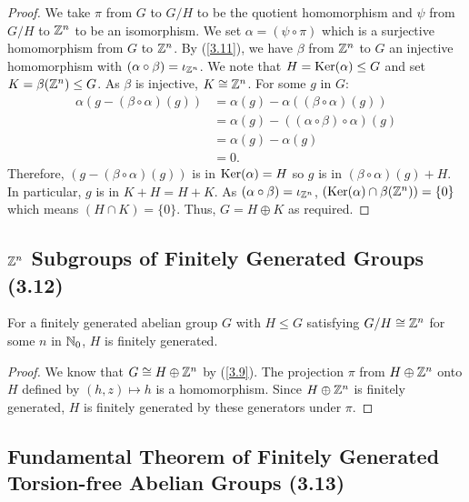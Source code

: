 \begin{proof}
    We take $\pi$ from $G$ to $G/H$ to be the quotient homomorphism and
    $\psi$ from $G / H$ to $\mathbb{Z}^n$ to be an isomorphism. We set 
    $\alpha = (\psi \circ \pi)$ which is a surjective homomorphism from
    $G$ to $\mathbb{Z}^n$.
    By (\ref{3.11}), we have $\beta$ from $\mathbb{Z}^n$ to $G$ an injective
    homomorphism with $(\alpha \circ \beta) = \iota_{\mathbb{Z}^n}$. We note
    that $H = \operatorname{Ker}(\alpha) \leq G$ and set $K = \beta(\mathbb{Z}^n) \leq G$.
    As $\beta$ is injective, $K \cong \mathbb{Z}^n$.
    For some $g$ in $G$: \begin{align*}
        \alpha(g - (\beta \circ \alpha)(g)) 
        &= \alpha(g) - \alpha((\beta \circ \alpha)(g)) \\
        &= \alpha(g) - ((\alpha \circ \beta) \circ \alpha)(g) \\
        &= \alpha(g) - \alpha(g) \\
        &= 0.
    \end{align*} Therefore, $(g - (\beta \circ \alpha)(g))$ is in 
    $\operatorname{Ker}(\alpha) = H$ so $g$ is in $(\beta \circ \alpha)(g) + H$.
    In particular, $g$ is in $K + H = H + K$. As 
    $(\alpha \circ \beta) = \iota_{\mathbb{Z}^n}$, 
    $(\operatorname{Ker}(\alpha) \cap \beta(\mathbb{Z}^n)) = \{0\}$ which means $(H \cap K) = \{0\}$.
    Thus, $G = H \oplus K$ as required.
\end{proof}

\subsection{$\mathbb{Z}^n$ Subgroups of Finitely Generated Groups (3.12)} \label{3.12}

For a finitely generated abelian group $G$ with $H \leq G$ satisfying
$G / H \cong \mathbb{Z}^n$ for some $n$ in $\mathbb{N}_0$, $H$ is finitely generated.

\begin{proof}
    We know that $G \cong H \oplus \mathbb{Z}^n$ by (\ref{3.9}).
    The projection $\pi$ from $H \oplus \mathbb{Z}^n$ onto $H$ defined by
    $(h, z) \mapsto h$ is a homomorphism. Since $H \oplus \mathbb{Z}^n$
    is finitely generated, $H$ is finitely generated by these generators
    under $\pi$.
\end{proof}

\subsection{Fundamental Theorem of Finitely Generated Torsion-free Abelian Groups (3.13)}
\label{3.13}

